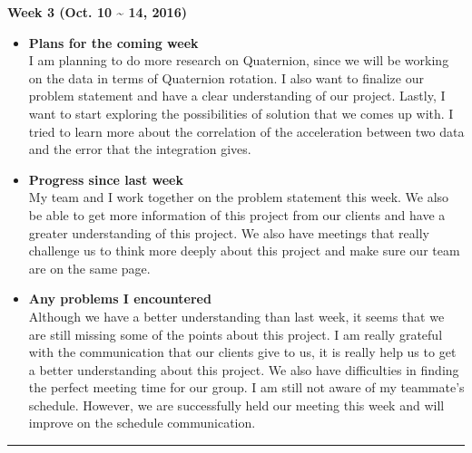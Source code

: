 		\begin{center}
			\textbf{Week 3 (Oct. 10 {\textasciitilde{}} 14, 2016)}
		\end{center}
		\begin{itemize}
			\item \textbf{Plans for the coming week}
			\\I am planning to do more research on Quaternion, since we will be working on the data in terms of Quaternion rotation. I also want to finalize our problem statement and have a clear understanding of our project. Lastly, I want to start exploring the possibilities of solution that we comes up with. I tried to learn more about the correlation of the acceleration between two data and the error that the integration gives.\\

			\item \textbf{Progress since last week}
			\\My team and I work together on the problem statement this week. We also be able to get more information of this project from our clients and have a greater understanding of this project. We also have meetings that really challenge us to think more deeply about this project and make sure our team are on the same page. \\

			\item \textbf{Any problems I encountered}
			\\Although we have a better understanding than last week, it seems that we are still missing some of the points about this project. I am really grateful with the communication that our clients give to us, it is really help us to get a better understanding about this project. We also have difficulties in finding the perfect meeting time for our group. I am still not aware of my teammate’s schedule. However, we are successfully held our meeting this week and will improve on the schedule communication.\\
		\end{itemize}

		\rule{\textwidth}{0.5pt}

